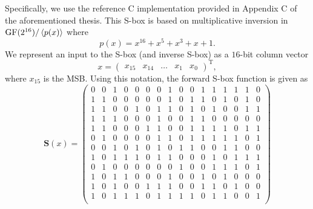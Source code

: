 Specifically, we use the reference C implementation provided in Appendix C of the aforementioned thesis.
This S-box is based on multiplicative inversion in $\mathrm{GF}(2^{16}) / \left\langle p(x) \right\rangle$ where 
\begin{equation*}
p(x) = x^{16} + x^5 + x^3 + x + 1.
\end{equation*}
We represent an input to the S-box (and inverse S-box) as a $16$-bit column vector 
\begin{equation*}
x = 
\begin{pmatrix}
x_{15} & x_{14} & \ldots & x_1 & x_0
\end{pmatrix}^\mathrm{T},
\end{equation*}
where $x_{15}$ is the MSB.
Using this notation, the forward S-box function is given as
\begin{equation*}
\renewcommand{\arraystretch}{0.7} %
\mathbf{S}(x) = 
\begin{pmatrix}
0 & 0 & 1 & 0 & 0 & 0 & 0 & 1 & 0 & 0 & 1 & 1 & 1 & 1 & 1 & 0 \\
1 & 1 & 0 & 0 & 0 & 0 & 0 & 1 & 0 & 1 & 1 & 0 & 1 & 0 & 1 & 0 \\
1 & 1 & 0 & 0 & 1 & 0 & 1 & 1 & 0 & 1 & 0 & 1 & 0 & 0 & 1 & 1 \\
1 & 1 & 1 & 0 & 0 & 0 & 1 & 0 & 0 & 1 & 1 & 0 & 0 & 0 & 0 & 0 \\

1 & 1 & 0 & 0 & 0 & 1 & 1 & 0 & 0 & 1 & 1 & 1 & 1 & 0 & 1 & 1 \\
0 & 1 & 0 & 0 & 0 & 0 & 1 & 1 & 0 & 1 & 1 & 1 & 1 & 1 & 0 & 1 \\
0 & 0 & 1 & 0 & 1 & 0 & 1 & 0 & 1 & 1 & 0 & 0 & 1 & 1 & 0 & 0 \\
1 & 0 & 1 & 1 & 1 & 0 & 1 & 1 & 0 & 0 & 0 & 1 & 0 & 1 & 1 & 1 \\

0 & 1 & 0 & 0 & 0 & 0 & 0 & 0 & 1 & 0 & 0 & 1 & 1 & 1 & 0 & 1 \\
1 & 0 & 1 & 1 & 0 & 0 & 0 & 1 & 0 & 0 & 1 & 0 & 1 & 0 & 0 & 0 \\
1 & 0 & 1 & 0 & 0 & 1 & 1 & 1 & 0 & 0 & 1 & 1 & 0 & 1 & 0 & 0 \\
1 & 0 & 1 & 1 & 1 & 0 & 1 & 1 & 1 & 1 & 0 & 1 & 1 & 0 & 0 & 1 \\


\end{pmatrix}
\end{equation*}
